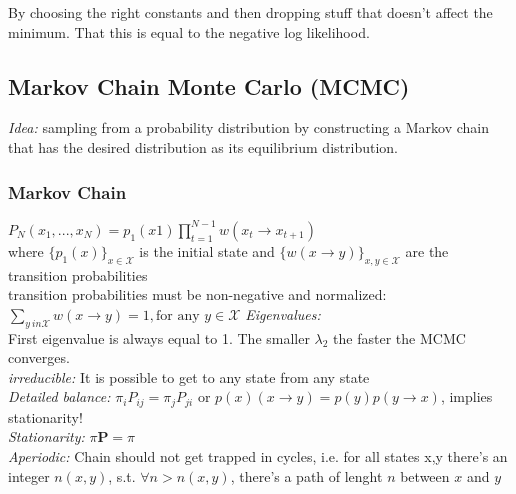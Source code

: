 \documentclass[9pt,parskip]{scrartcl}
\begin{document}
\begin{multicols*}{4}
By choosing the right constants and then dropping stuff that doesn't affect the minimum. That this is equal to the negative log likelihood. 

\subsection*{Markov Chain Monte Carlo (MCMC)}
\textit{Idea:} sampling from a probability distribution by constructing a Markov chain that has the desired distribution as its equilibrium distribution. 

\subsubsection*{Markov Chain}

$P_N (x_1,... ,x_N ) = p_1(x1) \prod^{N-1}_{t=1} w(x_t \to x_{t+1})$ \\ 
where $\{p_1(x)\}_{x \in \mathcal{X}}$ is the initial state and $\{w(x \to y)\}_{x,y \in \mathcal{X}}$ are the
transition probabilities \\
 transition probabilities must be
non-negative and normalized:
$\sum_{y \ in \mathcal{X}} w(x \to y) = 1 , \text{for any } y \in \mathcal{X}$
\textit{Eigenvalues: }\\
First eigenvalue is always equal to 1. The smaller $\lambda_2$ the faster the MCMC converges. \\
\textit{irreducible: } It is possible to get to any state from any state \\
\textit{Detailed balance: } $\pi _{i}P_{ij}=\pi _{j}P_{ji}$ or $p(x) (x \to y) = p(y) p(y \to x)$, implies stationarity! \\
\textit{Stationarity: } $\pi \mathbf {P} =\pi$ \\
\textit{Aperiodic: } Chain should not get trapped in cycles, i.e. for all states x,y there's an integer $n(x,y)$, s.t. $\forall n > n(x,y)$, there's a path of lenght $n$ between $x$ and $y$ \\



\end{multicols*}
\end{document}
